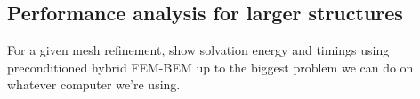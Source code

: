 \subsection*{\sffamily \large Performance analysis for larger structures}

For a given mesh refinement, show solvation energy and timings using preconditioned hybrid FEM-BEM up to the biggest problem we can do on whatever computer we're using.
